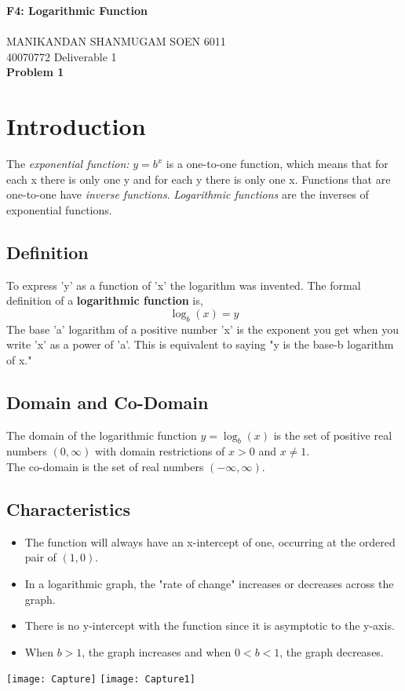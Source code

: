 \documentclass[a4paper, 11pt]{article}
\begin{document}
\noindent
\large\textbf{F4: Logarithmic Function} \\\\
\normalsize MANIKANDAN SHANMUGAM \hfill SOEN 6011\\
40070772 \hfill Deliverable 1\\
\large\textbf{Problem 1} \\
\section*{Introduction}
The \textit{exponential function:} $y=b^x$ is a one-to-one function, which means that for each x there is only one y and for each y there is only one x. Functions that are one-to-one have \textit{inverse functions}. \textit{Logarithmic functions} are the inverses of exponential functions.

\subsection*{Definition}
To express 'y' as a function of 'x' the logarithm was invented. The formal definition of a \textbf{logarithmic function} is,\begin{equation}\log _b \left( x \right)=y\end{equation}The base 'a' logarithm of a positive number 'x' is the exponent you get when you write 'x' as a power of 'a'. This is equivalent to saying "y is the base-b logarithm of x."

\subsection*{Domain and Co-Domain}
The domain of the logarithmic function $y=\log _b \left( x \right)$ is the set of positive real numbers $(0,\infty)$ with domain restrictions of $x > 0$ and $x\not=1$.\\
The co-domain is the set of real numbers $(-\infty,\infty)$. 

\subsection*{Characteristics}
\begin{itemize}
    \item The function will always have an x-intercept of one, occurring at the ordered pair of $(1,0)$.
    \item In a logarithmic graph, the "rate of change" increases or decreases across the graph.
    \item There is no y-intercept with the function since it is asymptotic to the y-axis.
    \item When $b > 1$, the graph increases and when $0 < b < 1$, the graph decreases.
\end{itemize}
\texttt{[image: Capture]} \texttt{[image: Capture1]}
\end{document}
